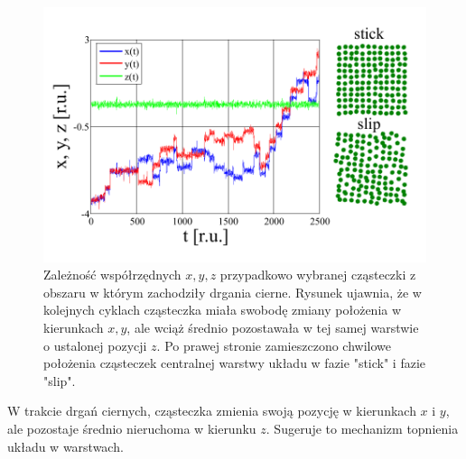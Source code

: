\documentclass[12pt,a4paper,openright]{report} %
\begin{document}
\begin{figure}[h]
\centering
\includegraphics[width=160mm]{rysunki/SS-ruch-1-cz.pdf}
\caption{Zależność współrzędnych $x,y,z$ przypadkowo wybranej cząsteczki z obszaru w którym zachodziły drgania cierne. Rysunek ujawnia, że w kolejnych cyklach cząsteczka miała swobodę zmiany położenia w kierunkach $x,y$, ale wciąż średnio pozostawała w tej samej warstwie o ustalonej pozycji $z$. Po prawej stronie zamieszczono chwilowe położenia cząsteczek centralnej warstwy układu w fazie "stick" i fazie "slip".}
\label{SS-ruch-1-cz}
\end{figure}
%
W trakcie drgań ciernych, cząsteczka zmienia swoją pozycję w kierunkach $x$ i $y$, ale pozostaje średnio nieruchoma w kierunku $z$. Sugeruje to mechanizm topnienia układu w warstwach.
%
%
%
%
%
%
\end{document}
